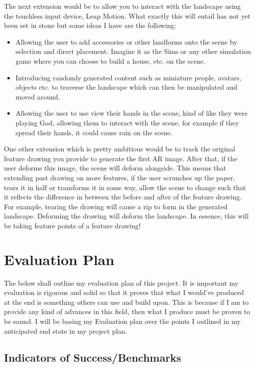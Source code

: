 \documentclass[11pt]{report}
\begin{document}
The next extension would be to allow you to interact with the landscape using
the touchless input device, Leap Motion. What exactly this will entail has not
yet been set in stone but some ideas I have are the following:
\begin{itemize}
	\item Allowing the user to add accessories or other landforms onto the
		  scene by selection and direct placement. Imagine it as the Sims or
		  any other simulation game where you can choose to build a house, etc.
		  on the scene.
	\item Introducing randomly generated content such as miniature people, 
		  avatars, objects etc. to traverse the landscape which can then be
		  manipulated and moved around. 
	\item Allowing the user to use view their hands in the scene, kind of like
		  they were playing God, allowing them to interact with the scene, for
		  example if they spread their hands, it could cause rain on the scene.
\end{itemize}

One other extension which is pretty ambitious would be to track the original 
feature drawing you provide to generate the first AR image. After that, if the
user deforms this image, the scene will deform alongside. This means that
extending past drawing on more features, if the user scrunches up the paper,
tears it in half or transforms it in some way, allow the scene to change such 
that it reflects the difference in between the before and after of the feature
drawing. For example, tearing the drawing will cause a rip to form in the 
generated landscape. Deforming the drawing will deform the landscape. In
essence, this will be taking feature points of a feature drawing!
\newpage
\section*{Evaluation Plan}
The below shall outline my evaluation plan of this project. It is important my 
evaluation is rigorous and solid so that it proves that what I would've produced at
the end is something others can use and build upon. This is because if I am to 
provide any kind of advances in this field, then what I produce must be proven to 
be sound. I will be basing my Evaluation plan over the points I outlined in my
anticipated end state in my project plan.

\subsection*{Indicators of Success/Benchmarks}
\end{document}
